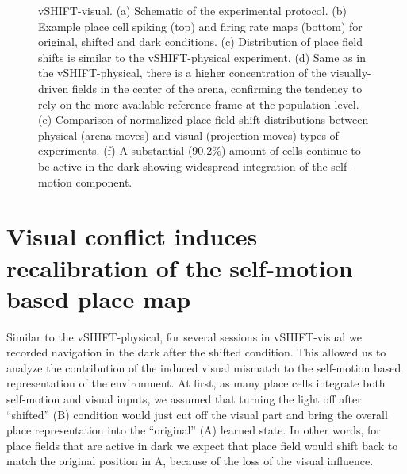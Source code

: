 \begin{figure}
\captionsetup{format=plain}
\caption[Visual shift induces sensory conflict]{
vSHIFT-visual. (a) Schematic of the experimental protocol. (b) Example place cell spiking (top) and firing rate maps (bottom) for original, shifted and dark conditions. (c) Distribution of place field shifts is similar to the vSHIFT-physical experiment. (d) Same as in the vSHIFT-physical, there is a higher concentration of the visually-driven fields in the center of the arena, confirming the tendency to rely on the more available reference frame at the population level. (e) Comparison of normalized place field shift distributions between physical (arena moves) and visual (projection moves) types of experiments. (f) A substantial (90.2\%) amount of cells continue to be active in the dark showing widespread integration of the self-motion component.
}
\label{fig:F25_visual_equals_physical}
\end{figure}


\section{Visual conflict induces recalibration of the self-motion based place map}
\label{sec:recalibration}

Similar to the vSHIFT-physical, for several sessions in vSHIFT-visual we recorded navigation in the dark after the shifted condition. This allowed us to analyze the contribution of the induced visual mismatch to the self-motion based representation of the environment. At first, as many place cells integrate both self-motion and visual inputs, we assumed that turning the light off after “shifted” (B) condition would just cut off the visual part and bring the overall place representation into the “original” (A) learned state. In other words, for place fields that are active in dark we expect that place field would shift back to match the original position in A, because of the loss of the visual influence.

